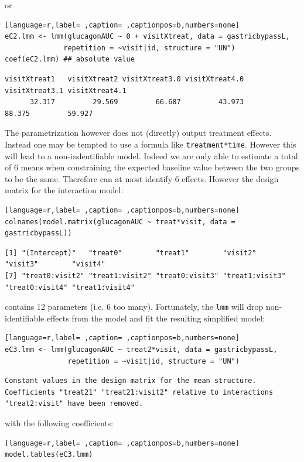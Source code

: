 \documentclass[12pt]{article}
\begin{document}
or
\begin{lstlisting}[language=r,label= ,caption= ,captionpos=b,numbers=none]
eC2.lmm <- lmm(glucagonAUC ~ 0 + visitXtreat, data = gastricbypassL,
              repetition = ~visit|id, structure = "UN")
coef(eC2.lmm) ## absolute value
\end{lstlisting}

\begin{verbatim}
visitXtreat1   visitXtreat2 visitXtreat3.0 visitXtreat4.0 visitXtreat3.1 visitXtreat4.1 
      32.317         29.569         66.687         43.973         88.375         59.927
\end{verbatim}


The parametrization however does not (directly) output treatment
effects. Instead one may be tempted to use a formula like
\texttt{treatment*time}. However this will lead to a non-indentifiable
model. Indeed we are only able to estimate a total of 6 means when
constraining the expected baseline value between the two groups to be
the same. Therefore can at most identify 6 effects. However the design
matrix for the interaction model:
\begin{lstlisting}[language=r,label= ,caption= ,captionpos=b,numbers=none]
colnames(model.matrix(glucagonAUC ~ treat*visit, data = gastricbypassL))
\end{lstlisting}

\begin{verbatim}
[1] "(Intercept)"   "treat0"        "treat1"        "visit2"        "visit3"        "visit4"       
[7] "treat0:visit2" "treat1:visit2" "treat0:visit3" "treat1:visit3" "treat0:visit4" "treat1:visit4"
\end{verbatim}


contains 12 parameters (i.e. 6 too many). Fortunately, the \texttt{lmm} will
 drop non-identifiable effects from the model and fit the resulting
 simplified model:
\begin{lstlisting}[language=r,label= ,caption= ,captionpos=b,numbers=none]
eC3.lmm <- lmm(glucagonAUC ~ treat2*visit, data = gastricbypassL,
               repetition = ~visit|id, structure = "UN")
\end{lstlisting}

\begin{verbatim}
Constant values in the design matrix for the mean structure.
Coefficients "treat21" "treat21:visit2" relative to interactions "treat2:visit" have been removed.
\end{verbatim}


with the following coefficients:
\begin{lstlisting}[language=r,label= ,caption= ,captionpos=b,numbers=none]
model.tables(eC3.lmm)
\end{lstlisting}
\end{document}
